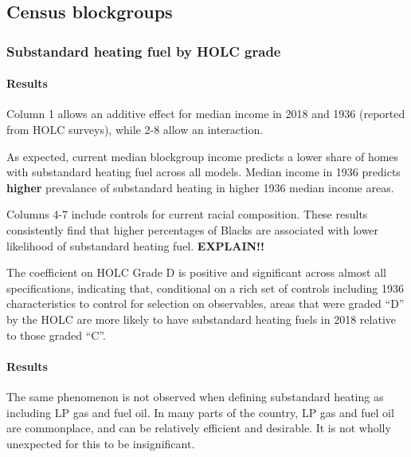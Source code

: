 \documentclass[
]{article}
\begin{document}
\hypertarget{census-blockgroups}{%
\subsection{Census blockgroups}\label{census-blockgroups}}

\hypertarget{substandard-heating-fuel-by-holc-grade}{%
\subsubsection{Substandard heating fuel by HOLC grade}\label{substandard-heating-fuel-by-holc-grade}}

\hypertarget{results}{%
\paragraph{Results}\label{results}}

Column 1 allows an additive effect for median income in 2018 and 1936 (reported from HOLC surveys), while 2-8 allow an interaction.

As expected, current median blockgroup income predicts a lower share of homes with substandard heating fuel across all models.
Median income in 1936 predicts \textbf{higher} prevalance of substandard heating in higher 1936 median income areas.

Columns 4-7 include controls for current racial composition.
These results consistently find that higher percentages of Blacks are associated with lower likelihood of substandard heating fuel. \textbf{EXPLAIN!!}

The coefficient on HOLC Grade D is positive and significant across almost all specifications, indicating that, conditional on a rich set of controls
including 1936 characteristics to control for selection on observables, areas that were graded ``D'' by the HOLC are more likely to have substandard
heating fuels in 2018 relative to those graded ``C''.

\hypertarget{results-1}{%
\paragraph{Results}\label{results-1}}

The same phenomenon is not observed when defining substandard heating as including LP gas and fuel oil. In many parts
of the country, LP gas and fuel oil are commonplace, and can be relatively efficient and desirable. It is not wholly
unexpected for this to be insignificant.
\end{document}
